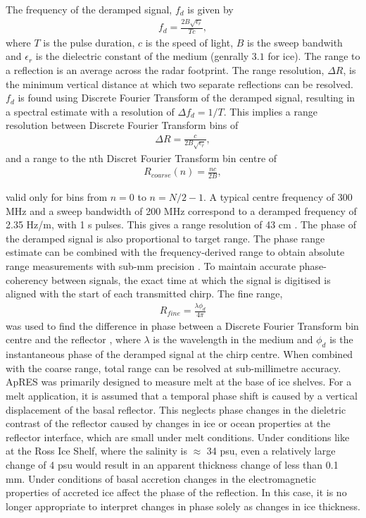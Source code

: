 The frequency of the deramped signal, $f_d$ is given by
\begin{align}
    f_d = \frac{2 B \sqrt{\epsilon_r}}{Tc},
\end{align}
where $T$ is the pulse duration, $c$ is the speed of light, $B$ is the sweep bandwith and $\epsilon_r$ is the dielectric constant of the medium (genrally $3.1$ for ice).
The range to a reflection is an average across the radar footprint. The range resolution, $\Delta R$, is the minimum vertical distance at which two separate reflections can be resolved.
$f_d$ is found using Discrete Fourier Transform of the deramped signal, resulting in a spectral estimate with a resolution of $\Delta f_d = 1 /T$. This implies a range resolution between Discrete Fourier Transform bins of
\begin{align}
    \Delta R = \frac{c}{2B \sqrt{\epsilon_r} },
\end{align}
and a range to the nth Discret Fourier Transform bin centre of
\begin{align}
    R_{coarse}(n) = \frac{n c}{2B},
\end{align}

valid only for bins from $n = 0$ to $n= N/2 -1$. %
 A typical centre frequency of 300 MHz and a sweep bandwidth of 200 MHz correspond to a deramped frequency of 2.35 Hz/m, with 1 s pulses. This gives a range resolution of 43 cm \cite{brennan2014phase}.
The phase of the deramped signal is also proportional to target range. The phase range estimate can be combined with the frequency-derived range to obtain absolute range measurements with sub-mm precision \cite{brennan2014phase}. To maintain accurate phase-coherency between signals, the exact time at which the signal is digitised is aligned with the start of each transmitted chirp. The fine range,
\begin{align}
    R_{fine} = \frac{\lambda \phi_d}{4 \pi}
\end{align}
was used to find the difference in phase between a Discrete Fourier Transform bin centre and the reflector \cite{brennan2014phase}, where $\lambda$ is the wavelength in the medium and $\phi_d$ is the instantaneous phase of the deramped signal at the chirp centre.
When combined with the coarse range, total range can be resolved at sub-millimetre accuracy. 
ApRES was primarily designed to measure melt at the base of ice shelves. For a melt application, it is assumed that a temporal phase shift is caused by a vertical displacement of the basal reflector. This neglects phase changes in the dieletric contrast of the reflector caused by changes in ice or ocean properties at the reflector interface, which are small under melt conditions. Under  conditions like at the Ross Ice Shelf, where the salinity is $\approx$ 34 psu, even a relatively large change of 4 psu would result in an apparent thickness change of less than 0.1 mm.
Under conditions of basal accretion changes in the electromagnetic properties of accreted ice affect the phase of the reflection. In this case, it is no longer appropriate to interpret changes in phase solely as changes in ice thickness.


